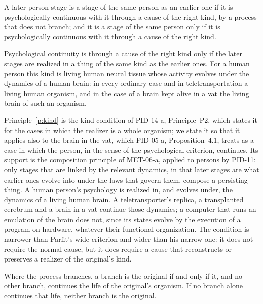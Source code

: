 \documentclass{situationist-preprint}
\begin{document}
\begin{principle}\label{p:psych}
A later person-stage is a stage of the same person as an earlier one if it is psychologically continuous with it through a cause of the right kind, by a process that does not branch; and it is a stage of the same person only if it is psychologically continuous with it through a cause of the right kind.
\end{principle}

\begin{principle}\label{p:kind}
Psychological continuity is through a cause of the right kind only if the later stages are realized in a thing of the same kind as the earlier ones. For a human person this kind is living human neural tissue whose activity evolves under the dynamics of a human brain: in every ordinary case and in teletransportation a living human organism, and in the case of a brain kept alive in a vat the living brain of such an organism.
\end{principle}

Principle~\ref{p:kind} is the kind condition of PID-14-a, Principle~P2, which states it for the cases in which the realizer is a whole organism; we state it so that it applies also to the brain in the vat, which PID-05-a, Proposition~4.1, treats as a case in which the person, in the sense of the psychological criterion, continues. Its support is the composition principle of MET-06-a, applied to persons by PID-11: only stages that are linked by the relevant dynamics, in that later stages are what earlier ones evolve into under the laws that govern them, compose a persisting thing. A human person's psychology is realized in, and evolves under, the dynamics of a living human brain. A teletransporter's replica, a transplanted cerebrum and a brain in a vat continue those dynamics; a computer that runs an emulation of the brain does not, since its states evolve by the execution of a program on hardware, whatever their functional organization. The condition is narrower than Parfit's wide criterion and wider than his narrow one: it does not require the normal cause, but it does require a cause that reconstructs or preserves a realizer of the original's kind.

\begin{principle}\label{p:tie}
Where the process branches, a branch is the original if and only if it, and no other branch, continues the life of the original's organism. If no branch alone continues that life, neither branch is the original.
\end{principle}
\end{document}
